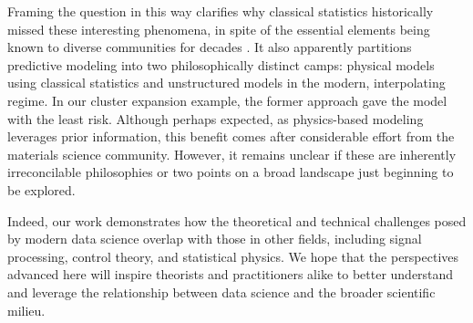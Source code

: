 \documentclass[twocolumn,aps,prx,superscriptaddress,10pt]{revtex4-2}
\newcommand{\0}{\bm{0}}
\begin{document}
Framing the question in this way clarifies why classical statistics historically missed these interesting phenomena, in spite of the essential elements being known to diverse communities for decades \cite{LoogVieringMeyKrijtheTax2020}.
It also apparently partitions predictive modeling into two philosophically distinct camps: physical models using classical statistics and unstructured models in the modern, interpolating regime.
In our cluster expansion example, the former approach gave the model with the least risk.
Although perhaps expected, as physics-based modeling leverages prior information, this benefit comes after considerable effort from the materials science community.
However, it remains unclear if these are inherently irreconcilable philosophies or two points on a broad landscape just beginning to be explored.

Indeed, our work demonstrates how the theoretical and technical challenges posed by modern data science overlap with those in other fields, including signal processing, control theory, and statistical physics.
We hope that the perspectives advanced here will inspire theorists and practitioners alike to better understand and leverage the relationship between data science and the broader scientific milieu.





 





    
\end{document}
